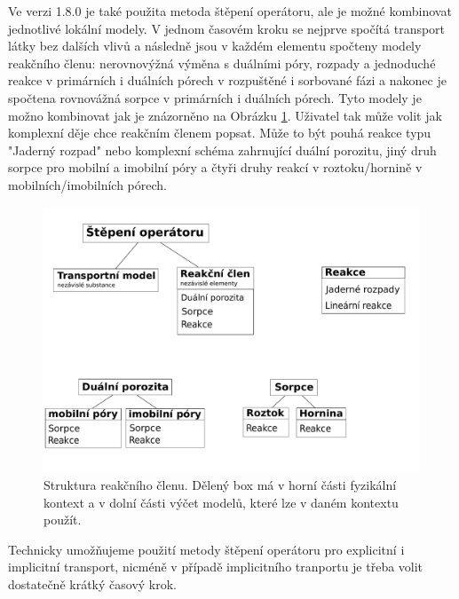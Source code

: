 \documentclass[11pt]{report}
\begin{document}
Ve verzi 1.8.0 je také použita metoda štěpení operátoru, ale je možné kombinovat 
jednotlivé lokální modely. V jednom časovém kroku se nejprve spočítá transport 
látky bez dalších vlivů a následně jsou v každém elementu spočteny
modely reakčního členu: nerovnovýžná výměna s duálními póry, rozpady a 
jednoduché reakce v primárních i duálních pórech v rozpuštěné i sorbované fázi a 
nakonec je spočtena rovnovážná sorpce v primárních i duálních pórech. Tyto 
modely je možno kombinovat jak je znázorněno na Obrázku 
\ref{fig:reaction_term}. Uživatel tak může volit jak komplexní děje chce 
reakčním členem popsat. Může to být pouhá reakce typu "Jaderný rozpad" nebo 
komplexní schéma zahrnující duální porozitu, jiný druh sorpce pro mobilní a 
imobilní póry a čtyři druhy reakcí v roztoku/hornině v mobilních/imobilních 
pórech.

\begin{figure}[h]
 \centering
 \includegraphics[scale=0.4]{./reaction_term.pdf}
 \caption{Struktura reakčního členu. Dělený box má v horní části fyzikální 
kontext a v dolní části výčet modelů, které lze v daném kontextu použít.}
 \label{fig:reaction_term}
\end{figure}


Technicky umožňujeme použití 
metody štěpení operátoru pro explicitní i implicitní transport, nicméně v 
případě implicitního tranportu je třeba volit dostatečně krátký časový krok.
\end{document}
